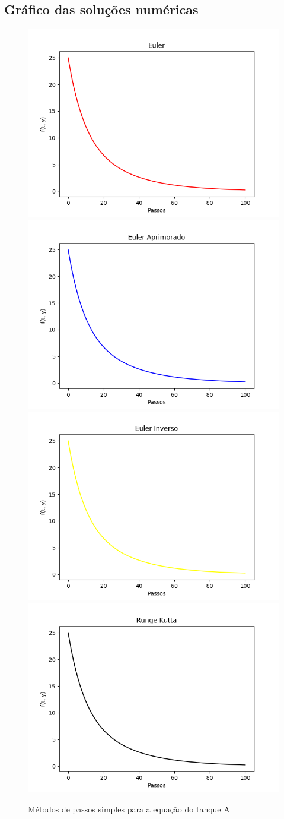 \documentclass[12pt]{article}%
\begin{document}
    \newpage
    \subsection{Gráfico das soluções numéricas}
    \begin{figure}[H]
        \begin{center}
            \includegraphics[width=.4\textwidth]{problemas/metodos_q1/tanque_a_euler.png}
            \includegraphics[width=.4\textwidth]{problemas/metodos_q1/tanque_a_euler_aprimorado.png}
            \includegraphics[width=.4\textwidth]{problemas/metodos_q1/tanque_a_euler_inverso.png}
            \includegraphics[width=.4\textwidth]{problemas/metodos_q1/tanque_a_runge_kutta.png}
        \end{center}
        \caption{Métodos de passos simples para a equação do tanque A}
    \end{figure}
\end{document}
